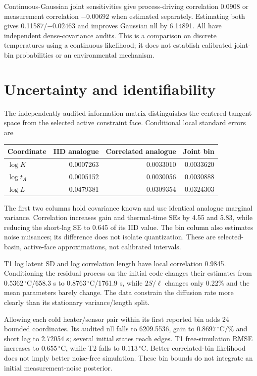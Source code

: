 \documentclass[10pt,letterpaper]{article}
\newcommand{\C}{\,^\circ\mathrm{C}}
\begin{document}
Continuous-Gaussian joint sensitivities give process-driving correlation
0.0908 or measurement correlation $-0.00692$ when estimated separately.
Estimating both gives 0.11587/$-0.02463$ and improves Gaussian nll by 6.14891.
All have independent dense-covariance audits. This is a comparison on discrete
temperatures using a continuous likelihood; it does not establish calibrated
joint-bin probabilities or an environmental mechanism.

\clearpage
\section{Uncertainty and identifiability}
The independently audited information matrix distinguishes the centered
tangent space from the selected active constraint face. Conditional local
standard errors are
\begin{center}
\begin{tabular}{@{}lrrr@{}}
\toprule
Coordinate & IID analogue & Correlated analogue & Joint bin\\
\midrule
$\log K$ & 0.0007263 & 0.0033010 & 0.0033620\\
$\log t_A$ & 0.0005152 & 0.0030056 & 0.0030888\\
$\log L$ & 0.0479381 & 0.0309354 & 0.0324303\\
\bottomrule
\end{tabular}
\end{center}
The first two columns hold covariance known and use identical analogue
marginal variance. Correlation increases gain and thermal-time SEs by 4.55 and
5.83, while reducing the short-lag SE to 0.645 of its IID value. The bin column
also estimates noise nuisances; its difference does not isolate quantization.
These are selected-basin, active-face approximations, not calibrated intervals.

T1 log latent SD and log correlation length have local correlation 0.9845.
Conditioning the residual process on the initial code changes their estimates
from $0.5362\C$/658.3 s to $0.8763\C$/1761.9 s, while $2S/\ell$ changes only
0.22\% and the mean parameters barely change. The data constrain the diffusion
rate more clearly than its stationary variance/length split.

Allowing each cold heater/sensor pair within its first reported bin adds 24
bounded coordinates. Its audited nll falls to 6209.5536, gain to
$0.8697\C/\%$ and short lag to 2.72054 s; several initial states reach edges.
T1 free-simulation RMSE increases to $0.655\C$, while T2 falls to $0.113\C$.
Better correlated-bin likelihood does not imply better noise-free simulation.
These bin bounds do not integrate an initial measurement-noise posterior.
\end{document}
